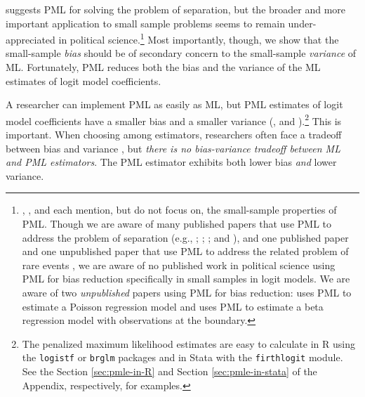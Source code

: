 \documentclass[12pt]{article}
\begin{document}
\cite{Zorn2005} suggests PML for solving the problem of separation,
but the broader and more important application to small sample problems seems to remain under-appreciated in political science.\footnote{\cite{KingZeng2001}, \cite{Zorn2005}, and \cite{Rainey-separation} each mention, but do not focus on, the small-sample properties of PML. Though we are aware of many published papers that use PML to address the problem of separation (e.g., \citealt{BellMiller2015}; \citealt{ViningWilhelmCollens2015}; \citealt{LeemanMares2014}; and \citealt{BarrilleauxRainey2014}), and one published paper \citep{ChachaPowell2016} and one unpublished paper \citep{KaplowGartzke2015} that use PML to address the related problem of rare events \citep{KingZeng2001}, we are aware of no published work in political science using PML for bias reduction specifically in small samples in logit models. 
We are aware of two \textit{unpublished} papers using PML for bias reduction: \cite{Betz2015b} uses PML to estimate a Poisson regression model and \cite{Betz2015a} uses PML to estimate a beta regression model with observations at the boundary.} 
Most importantly, though, we show that the small-sample \textit{bias} should be of secondary concern to the small-sample \textit{variance} of ML. 
Fortunately, PML reduces both the bias and the variance of the ML estimates of logit model coefficients.


A researcher can implement PML as easily as ML, but PML estimates of logit model coefficients have a smaller bias \citep{Firth1993} and a smaller variance (\citealt[p. 49]{Kosmidis2007}, and \citealt{Copas1988}).\footnote{The penalized maximum likelihood estimates are easy to calculate in R using the \texttt{logistf} \citep{logistf} or \texttt{brglm} \citep{brglm} packages and in Stata with the \texttt{firthlogit} \citep{firthlogit} module. 
See the Section \ref{sec:pmle-in-R} and Section \ref{sec:pmle-in-stata} of the Appendix, respectively, for examples.}
This is important.
When choosing among estimators, researchers often face a tradeoff between bias and variance \citep[pp. 37-38]{HastieTibshiraniFriedman2013}, but \textit{there is no bias-variance tradeoff between ML and PML estimators}.
The PML estimator exhibits both lower bias \textit{and} lower variance.
\end{document}
